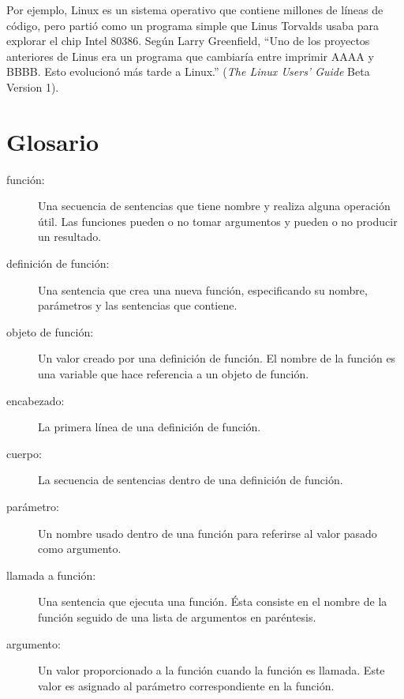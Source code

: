 \documentclass[10pt]{book}
\begin{document}
Por ejemplo, Linux es un sistema operativo que contiene millones de
líneas de código, pero partió como un programa simple que Linus Torvalds
usaba para explorar el chip Intel 80386.  Según Larry Greenfield,
``Uno de los proyectos anteriores de Linus era un programa que cambiaría
entre imprimir AAAA y BBBB.  Esto evolucionó más tarde a Linux.''
({\em The Linux Users' Guide} Beta Version 1).


\section{Glosario}

\begin{description}

\item[función:] Una secuencia de sentencias que tiene nombre y realiza alguna
operación útil.  Las funciones pueden o no tomar argumentos y pueden o no
producir un resultado.

\item[definición de función:]  Una sentencia que crea una nueva función,
especificando su nombre, parámetros y las sentencias que contiene.

\item[objeto de función:]  Un valor creado por una definición de función.
El nombre de la función es una variable que hace referencia a un objeto
de función.

\item[encabezado:] La primera línea de una definición de función.

\item[cuerpo:] La secuencia de sentencias dentro de una definición de función.

\item[parámetro:] Un nombre usado dentro de una función para referirse al valor
pasado como argumento.

\item[llamada a función:] Una sentencia que ejecuta una función. Ésta
consiste en el nombre de la función seguido de una lista de argumentos en
paréntesis.

\item[argumento:]  Un valor proporcionado a la función cuando la función es llamada.
Este valor es asignado al parámetro correspondiente en la función.


\end{description}
\end{document}
